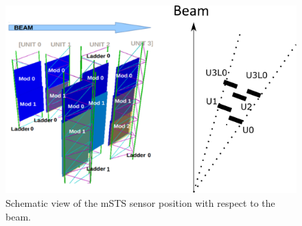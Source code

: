 \begin{figure}[!h]
\centering
\includegraphics[width=0.65\columnwidth]{Chapter6/DCS/images/msts_sensors_scheme2.png}
\caption{Schematic view of the \gls{mSTS} sensor position with respect to the beam.}
\label{fig_sensors_scheme}
\end{figure}
\newpage
